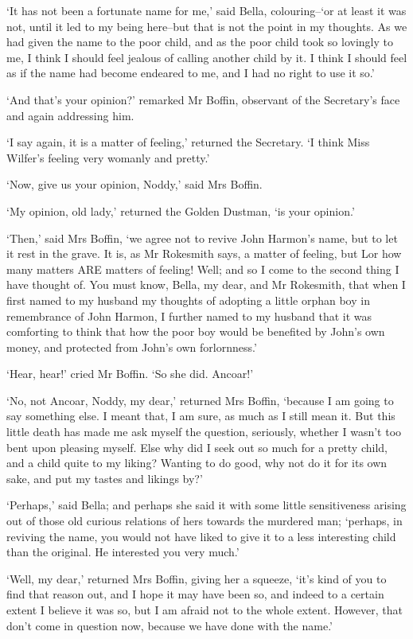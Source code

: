 ‘It has not been a fortunate name for me,’ said Bella, colouring--‘or
at least it was not, until it led to my being here--but that is not the
point in my thoughts. As we had given the name to the poor child, and as
the poor child took so lovingly to me, I think I should feel jealous of
calling another child by it. I think I should feel as if the name had
become endeared to me, and I had no right to use it so.’

‘And that’s your opinion?’ remarked Mr Boffin, observant of the
Secretary’s face and again addressing him.

‘I say again, it is a matter of feeling,’ returned the Secretary. ‘I
think Miss Wilfer’s feeling very womanly and pretty.’

‘Now, give us your opinion, Noddy,’ said Mrs Boffin.

‘My opinion, old lady,’ returned the Golden Dustman, ‘is your opinion.’

‘Then,’ said Mrs Boffin, ‘we agree not to revive John Harmon’s name, but
to let it rest in the grave. It is, as Mr Rokesmith says, a matter of
feeling, but Lor how many matters ARE matters of feeling! Well; and so
I come to the second thing I have thought of. You must know, Bella,
my dear, and Mr Rokesmith, that when I first named to my husband my
thoughts of adopting a little orphan boy in remembrance of John Harmon,
I further named to my husband that it was comforting to think that how
the poor boy would be benefited by John’s own money, and protected from
John’s own forlornness.’

‘Hear, hear!’ cried Mr Boffin. ‘So she did. Ancoar!’

‘No, not Ancoar, Noddy, my dear,’ returned Mrs Boffin, ‘because I am
going to say something else. I meant that, I am sure, as much as
I still mean it. But this little death has made me ask myself the
question, seriously, whether I wasn’t too bent upon pleasing myself.
Else why did I seek out so much for a pretty child, and a child quite to
my liking? Wanting to do good, why not do it for its own sake, and put
my tastes and likings by?’

‘Perhaps,’ said Bella; and perhaps she said it with some little
sensitiveness arising out of those old curious relations of hers towards
the murdered man; ‘perhaps, in reviving the name, you would not have
liked to give it to a less interesting child than the original. He
interested you very much.’

‘Well, my dear,’ returned Mrs Boffin, giving her a squeeze, ‘it’s kind
of you to find that reason out, and I hope it may have been so, and
indeed to a certain extent I believe it was so, but I am afraid not to
the whole extent. However, that don’t come in question now, because we
have done with the name.’


